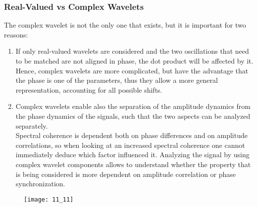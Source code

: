 \subsubsection{Real-Valued vs Complex Wavelets}
The complex wavelet is not the only one that exists, but it is important for two reasons:
\begin{enumerate}
    \item If only real-valued wavelets are considered and the two oscillations that need to be matched are not
          aligned in phase, the dot product will be affected by it. Hence, complex wavelets are more
          complicated, but have the advantage that the phase is one of the parameters, thus they
          allow a more general representation, accounting for all possible shifts.
    \item Complex wavelets enable also the separation of the amplitude dynamics from the phase dynamics of the
          signals, such that the two aspects can be analyzed separately.\\
          Spectral coherence is dependent both on phase differences and on amplitude correlations, so when looking
          at an increased spectral coherence one cannot immediately deduce which factor influenced it.
          Analyzing the signal by using complex wavelet components allows to understand whether the property
          that is being considered is more dependent on amplitude correlation or phase synchronization.
\end{enumerate}
\begin{figure}[H]
    \texttt{[image: 11\_11]}
    \centering
\end{figure}
